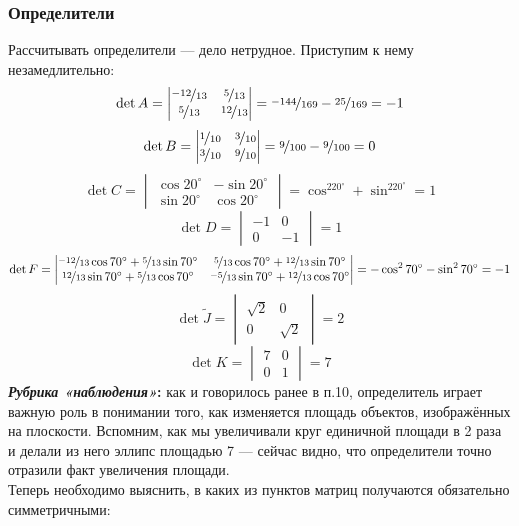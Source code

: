 \documentclass[a3paper,14pt]{extarticle}
\begin{document}
\subsubsection*{\centering Определители}
Рассчитывать определители --- дело нетрудное. Приступим к нему незамедлительно:
$$\det{A} = \begin{vmatrix}
    \nicefrac{-12}{13} & \nicefrac{5}{13} \\ \nicefrac{5}{13} & \nicefrac{12}{13}
\end{vmatrix} = \nicefrac{-144}{169}-\nicefrac{25}{169} = -1$$
$$\det{B} = \begin{vmatrix}
    \nicefrac{1}{10} & \nicefrac{3}{10} \\ \nicefrac{3}{10} & \nicefrac{9}{10}
\end{vmatrix} = \nicefrac{9}{100}-\nicefrac{9}{100} = 0$$
$$\det{C} = \begin{vmatrix}
    \cos20^\circ & -\sin20^\circ \\ \sin20^\circ & \cos20^\circ
\end{vmatrix} = \cos^220^\circ + \sin^220^\circ = 1$$
$$\det{D} = \begin{vmatrix}
    -1 & 0 \\ 0 & -1
\end{vmatrix} = 1$$
$$\det{F} = \begin{vmatrix}
    \nicefrac{-12}{13}\cos70^\circ + \nicefrac{5}{13}\sin70^\circ &
    \nicefrac{5}{13}\cos70^\circ + \nicefrac{12}{13}\sin70^\circ \\
    \nicefrac{12}{13}\sin70^\circ + \nicefrac{5}{13}\cos70^\circ &
    \nicefrac{-5}{13}\sin70^\circ + \nicefrac{12}{13}\cos70^\circ
\end{vmatrix} = -\cos^270^\circ-\sin^270^\circ = -1$$
$$\det{\tilde{J}} = \begin{vmatrix}
    \sqrt{2} & 0 \\ 0 & \sqrt{2}
\end{vmatrix} = 2$$
$$\det{K} = \begin{vmatrix}
    7 & 0 \\ 0 & 1
\end{vmatrix} = 7$$
\textbf{\textit{Рубрика «наблюдения»}:} как и говорилось ранее в п.10, определитель играет важную роль в понимании того, как изменяется площадь объектов, изображённых на плоскости. Вспомним, как мы увеличивали круг единичной площади в 2 раза и делали из него эллипс площадью 7 --- сейчас видно, что определители точно отразили факт увеличения площади.\\[1.5em]
Теперь необходимо выяснить, в каких из пунктов матриц получаются обязательно симметричными:
\end{document}
